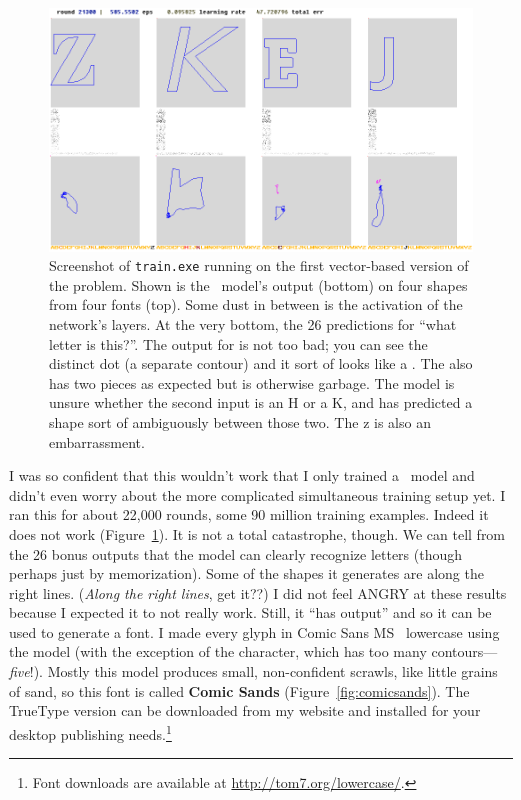\documentclass[twocolumn]{article}
\begin{document}
\begin{figure}[ht]
\centering
  \includegraphics[width=0.9 \linewidth]{trainingvector}
\caption{ Screenshot of {\tt train.exe} running on the first vector-based
  version of the problem. Shown is the \makelowercase\ model's output
  (bottom) on four shapes from four fonts (top). Some dust in between
  is the activation of the network's layers. At the very bottom, the
  26 predictions for ``what letter is this?''. The output for
   is not too bad; you can see the distinct dot (a
  separate contour) and it sort of looks like a . The
   also has two pieces as expected but is otherwise
  garbage. The model is unsure whether the second input is an H
  or a K, and has predicted a shape sort of ambiguously between those
  two. The \lowercase{z} is also an embarrassment.
} \label{fig:trainingvector}
\end{figure}

I was so {\tiny confident} that this wouldn't work that I only trained
a \makelowercase\ model and didn't even worry about the more
complicated simultaneous training setup yet. I ran this for about
22,000 rounds, some 90 million training examples. Indeed it does not
work (Figure~\ref{fig:trainingvector}). It is not a total catastrophe,
though. We can tell from the 26 bonus outputs that the model can
clearly recognize letters (though perhaps just by memorization). Some
of the shapes it generates are along the right lines. ({\em Along the
  right lines}, get it??) I did not feel ANGRY at these results
because I expected it to not really work. Still, it ``has output'' and
so it can be used to generate a font. I made every glyph in Comic Sans
MS~\cite{comicsans} lowercase using the model (with the exception of the
 character, which has too many contours---{\it five}!).
Mostly this model produces small, non-confident scrawls, like little
grains of sand, so this font is called {\bf Comic Sands}
(Figure~\ref{fig:comicsands}). The TrueType version can be downloaded
from my website and installed for your desktop publishing
needs.\footnote{Font downloads are available at
  \url{http://tom7.org/lowercase/}.}
\end{document}
